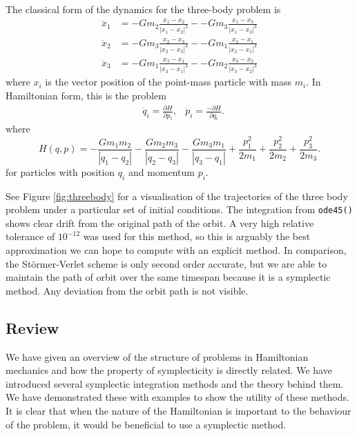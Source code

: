 The classical form of the dynamics for the three-body problem is
\begin{equation*}
	\begin{aligned}
		\ddot{x}_1 &= -G m_2 \frac{x_1 - x_2}{|x_1 - x_2|^3} - -G m_3 \frac{x_1 - x_3}{|x_1 - x_3|^3} \\
		\ddot{x}_2 &= -G m_3 \frac{x_2 - x_3}{|x_2 - x_3|^3} - -G m_1 \frac{x_2 - x_1}{|x_2 - x_1|^3} \\
		\ddot{x}_3 &= -G m_1 \frac{x_3 - x_1}{|x_3 - x_1|^3} - -G m_2 \frac{x_3 - x_2}{|x_3 - x_2|^3}
	\end{aligned}
\end{equation*} 
where $x_i$ is the vector position of the point-mass particle with mass $m_i$.
In Hamiltonian form, this is the problem
\begin{align*}
	&\dot{q}_i = \frac{\partial H}{\partial p_i}, &\dot{p}_i = \frac{- \partial H}{\partial q_i}.
\end{align*}
where
\begin{equation*}
	H(q,p) = - \frac{G m_1 m_2}{|q_1 - q_2|} - \frac{G m_2 m_3}{|q_2 - q_3|} - \frac{G m_3 m_1}{|q_3 - q_1|} + \frac{p_1^2}{2m_1} + \frac{p_2^2}{2m_2} + \frac{p_3^2}{2m_3}.
\end{equation*}
for particles with position $q_i$ and momentum $p_i$.

See Figure \ref{fig:threebody} for a visualisation of the trajectories of the three body problem under a particular set of initial conditions.
The integration from \texttt{ode45()} shows clear drift from the original path of the orbit.
A very high relative tolerance of $10^{-12}$ was used for this method, so this is arguably the best approximation we can hope to compute with an explicit method.
In comparison, the St\"ormer-Verlet scheme is only second order accurate, but we are able to maintain the path of orbit over the same timespan because it is a symplectic method.
Any deviation from the orbit path is not visible.

\subsection{Review}

We have given an overview of the structure of problems in Hamiltonian mechanics and how the property of symplecticity is directly related.
We have introduced several symplectic integration methods and the theory behind them.
We have demonstrated these with examples to show the utility of these methods.
It is clear that when the nature of the Hamiltonian is important to the behaviour of the problem, it would be beneficial to use a symplectic method.

